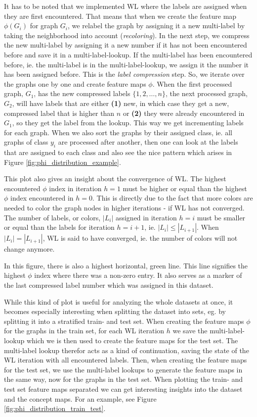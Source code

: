 It has to be noted that we implemented WL where the labels are assigned when they are first encountered. That means that when we create the feature map $\phi(G_i)$ for graph $G_i$, we relabel the graph by assigning it a new multi-label by taking the neighborhood into account (\textit{recoloring}). In the next step, we compress the new multi-label by assigning it a new number if it has not been encountered before and save it in a multi-label-lookup. If the multi-label has been encountered before, ie. the multi-label is in the multi-label-lookup, we assign it the number it has been assigned before.
This is the \textit{label compression} step.
So, we iterate over the graphs one by one and create feature maps $\phi$.
When the first processed graph, $G_1$, has the new compressed labels $\{1, 2, \ldots, n\}$, the next processed graph, $G_2$, will have labels that are either \textbf{(1)} new, in which case they get a new, compressed label that is higher than $n$ or \textbf{(2)} they were already encountered in $G_1$, so they get the label from the lookup.
This way we get incrementing labels for each graph.
When we also sort the graphs by their assigned class, ie. all graphs of class $y_i$ are processed after another, then one can look at the labels that are assigned to each class and also see the nice pattern which arises in Figure \ref{fig:phi_distribution_example}.

This plot also gives an insight about the convergence of WL.
The highest encountered $\phi$ index in iteration $h=1$ must be higher or equal than the highest $\phi$ index encountered in $h=0$.
This is directly due to the fact that more colors are needed to color the graph nodes in higher iterations - if WL has not converged.
The number of labels, or colors, $|L_i|$ assigned in iteration $h=i$ must be smaller or equal than the labels for iteration $h=i+1$, ie. $|L_i| \leq |L_{i + 1}|$.
When $|L_i| = |L_{i + 1}|$, WL is said to have converged, ie. the number of colors will not change anymore.

In this figure, there is also a highest horizontal, green line.
This line signifies the highest $\phi$ index where there was a non-zero entry.
It also serves as a marker of the last compressed label number which was assigned in this dataset.

While this kind of plot is useful for analyzing the whole datasets at once, it becomes especially interesting when splitting the dataset into sets, eg. by splitting it into a stratified train- and test set.
When creating the feature maps $\phi$ for the graphs in the train set, for each WL iteration $h$ we save the multi-label-lookup which we is then used to create the feature maps for the test set.
The multi-label lookup therefor acts as a kind of continuation, saving the state of the WL iteration with all encountered labels.
Then, when creating the feature maps for the test set, we use the multi-label lookups to generate the feature maps in the same way, now for the graphs in the test set.
When plotting the train- and test set feature maps separated we can get interesting insights into the dataset and the concept maps.
For an example, see Figure \ref{fig:phi_distribution_train_test}.

